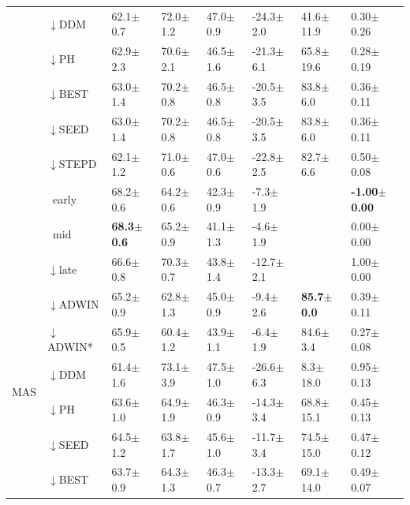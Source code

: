 \begin{tabular}{llllllll}
 & $\downarrow$DDM & 62.1\tiny{$\pm$0.7} & 72.0\tiny{$\pm$1.2} & 47.0\tiny{$\pm$0.9} & -24.3\tiny{$\pm$2.0} & 41.6\tiny{$\pm$11.9} & 0.30\tiny{$\pm$0.26} \\
 & $\downarrow$PH & 62.9\tiny{$\pm$2.3} & 70.6\tiny{$\pm$2.1} & 46.5\tiny{$\pm$1.6} & -21.3\tiny{$\pm$6.1} & 65.8\tiny{$\pm$19.6} & 0.28\tiny{$\pm$0.19} \\
 & $\downarrow$BEST & 63.0\tiny{$\pm$1.4} & 70.2\tiny{$\pm$0.8} & 46.5\tiny{$\pm$0.8} & -20.5\tiny{$\pm$3.5} & 83.8\tiny{$\pm$6.0} & 0.36\tiny{$\pm$0.11} \\
 & $\downarrow$SEED & 63.0\tiny{$\pm$1.4} & 70.2\tiny{$\pm$0.8} & 46.5\tiny{$\pm$0.8} & -20.5\tiny{$\pm$3.5} & 83.8\tiny{$\pm$6.0} & 0.36\tiny{$\pm$0.11} \\
 & $\downarrow$STEPD & 62.1\tiny{$\pm$1.2} & 71.0\tiny{$\pm$0.6} & 47.0\tiny{$\pm$0.6} & -22.8\tiny{$\pm$2.5} & 82.7\tiny{$\pm$6.6} & 0.50\tiny{$\pm$0.08} \\
 & $\ \;$early & 68.2\tiny{$\pm$0.6} & 64.2\tiny{$\pm$0.6} & 42.3\tiny{$\pm$0.9} & -7.3\tiny{$\pm$1.9} &  & \textbf{-1.00\tiny{$\pm$0.00}} \\
 & $\ \;$mid & \textbf{68.3\tiny{$\pm$0.6}} & 65.2\tiny{$\pm$0.9} & 41.1\tiny{$\pm$1.3} & -4.6\tiny{$\pm$1.9} &  & 0.00\tiny{$\pm$0.00} \\
 & $\downarrow$late & 66.6\tiny{$\pm$0.8} & 70.3\tiny{$\pm$0.7} & 43.8\tiny{$\pm$1.4} & -12.7\tiny{$\pm$2.1} &  & 1.00\tiny{$\pm$0.00} \\
\midrule
\multirow[t]{10}{*}{MAS} & $\downarrow$ADWIN & 65.2\tiny{$\pm$0.9} & 62.8\tiny{$\pm$1.3} & 45.0\tiny{$\pm$0.9} & -9.4\tiny{$\pm$2.6} & \textbf{85.7\tiny{$\pm$0.0}} & 0.39\tiny{$\pm$0.11} \\
 & $\downarrow$ADWIN* & 65.9\tiny{$\pm$0.5} & 60.4\tiny{$\pm$1.2} & 43.9\tiny{$\pm$1.1} & -6.4\tiny{$\pm$1.9} & 84.6\tiny{$\pm$3.4} & 0.27\tiny{$\pm$0.08} \\
 & $\downarrow$DDM & 61.4\tiny{$\pm$1.6} & 73.1\tiny{$\pm$3.9} & 47.5\tiny{$\pm$1.0} & -26.6\tiny{$\pm$6.3} & 8.3\tiny{$\pm$18.0} & 0.95\tiny{$\pm$0.13} \\
 & $\downarrow$PH & 63.6\tiny{$\pm$1.0} & 64.9\tiny{$\pm$1.9} & 46.3\tiny{$\pm$0.9} & -14.3\tiny{$\pm$3.4} & 68.8\tiny{$\pm$15.1} & 0.45\tiny{$\pm$0.13} \\
 & $\downarrow$SEED & 64.5\tiny{$\pm$1.2} & 63.8\tiny{$\pm$1.7} & 45.6\tiny{$\pm$1.0} & -11.7\tiny{$\pm$3.4} & 74.5\tiny{$\pm$15.0} & 0.47\tiny{$\pm$0.12} \\
 & $\downarrow$BEST & 63.7\tiny{$\pm$0.9} & 64.3\tiny{$\pm$1.3} & 46.3\tiny{$\pm$0.7} & -13.3\tiny{$\pm$2.7} & 69.1\tiny{$\pm$14.0} & 0.49\tiny{$\pm$0.07} \\

\end{tabular}
